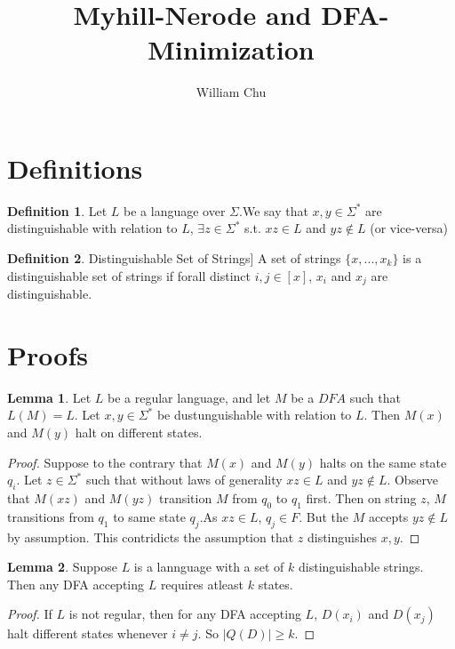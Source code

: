 \documentclass{article}
\theoremstyle{definition}
\newtheorem{definition}{Definition}[section]
\newtheorem{lemma}{Lemma}[section]
\begin{document}
 

\title{Myhill-Nerode and DFA-Minimization} 
\author{William Chu} 
\maketitle 

\section{Definitions}

\begin{definition}
Let $L$ be a language over $\Sigma$.We say that $x,y \in \Sigma^*$ are distinguishable with relation to $L$, $\exists z \in \Sigma^*$ s.t. $xz \in L$ and $yz \notin L$ (or vice-versa)
\end{definition}

\begin{definition}Distinguishable Set of Strings]
A set of strings $\{x,...,x_k\}$ is a distinguishable set of strings if forall distinct $i,j \in [x]$, $x_i$ and $x_j$ are distinguishable.
\end{definition}

\section{Proofs}

\begin{lemma}
Let $L$ be a regular language, and let $M$ be a $DFA$ such that $L(M)=L$. Let $x,y \in \Sigma^*$ be dustunguishable with relation to $L$. Then $M(x)$ and $M(y)$ halt on different states.
\end{lemma}
\begin{proof}
Suppose to the contrary that $M(x)$ and $M(y)$ halts on the same state $q_i$. Let $z \in \Sigma^*$ such that without laws of generality $xz \in L$ and $yz \notin L$. Observe that $M(xz)$ and $M(yz)$ transition $M$ from $q_0$ to $q_1$ first. Then on string $z$, $M$ transitions from $q_1$ to same state $q_j$.As $xz \in L$, $q_j \in F$. But the $M$ accepts $yz \notin L$ by assumption. This contridicts the assumption that $z$ distinguishes $x,y$.
\end{proof}

\begin{lemma}
Suppose $L$ is a lannguage with a set of $k$ distinguishable strings. Then any DFA accepting $L$ requires atleast $k$ states. 
\end{lemma}
\begin{proof}
If $L$ is not regular, then for any DFA accepting $L$, $D(x_i)$ and $D(x_j)$ halt different states whenever $i \neq j$. So $|Q(D)|\geq k$.
\end{proof}
\end{document}
